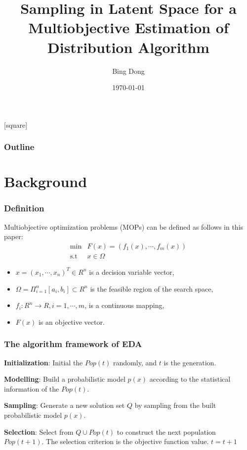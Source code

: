 \documentclass[xcolor=dvipsnames]{beamer}
\begin{document}
    \title[Evolutionary Multiobjective Optimization]{Sampling in Latent Space for a Multiobjective Estimation of Distribution Algorithm}
    \author{Bing Dong}
    \date{\today}
    \begin{frame}
        \titlepage
    \end{frame}
    [square]
    \begin{frame}
        \frametitle{Outline}
        \tableofcontents
    \end{frame}

    \section{Background}
    \begin{frame}
    \frametitle{Definition}
    Multiobjective optimization problems (MOPs) can be defined as follows in this paper:
    \begin{equation}
    \begin{array}{rl}
    \mbox{min} & F(x) = (f_1(x), \cdots, f_m(x))\\
    \mbox{s.t} & x \in \Omega
    \end{array}
    \label{MOP}
    \end{equation}

    \begin{itemize}
    \item $x=(x_1, \cdots, x_n)^T\in R^n$ is a decision variable vector,
    \item $\Omega=\Pi_{i=1}^{n}[a_i, b_i] \subset R^n$ is the feasible region of the search space,
    \item $f_i: R^n \rightarrow R, i=1, \cdots, m$, is a continuous mapping,
    \item $F(x)$ is an objective vector.
    \end{itemize}
    \end{frame}
    
    \begin{frame}
    \frametitle{The algorithm framework of EDA}
    \begin{algorithm}[H]
    \label{alg2}
    \textbf{Initialization}: Initial the $Pop(t)$ randomly, and $t$ is the generation.
    
    {
    \textbf{Modelling}: Build a probabilistic model $p(x)$ according to the statistical information of the $Pop(t)$.
    
    \textbf{Sampling}: Generate a new solution set $Q$ by sampling from the built probabilistic model $p(x)$.
    
    \textbf{Selection}: Select from $Q\cup{Pop(t)}$ to construct the next population $Pop(t+1)$. The selection criterion is the objective function value.
    $t=t+1$
    }
    \end{algorithm}
    \end{frame}
    
\end{document}
